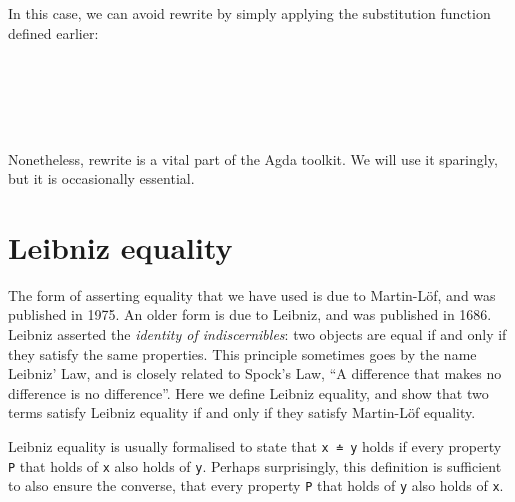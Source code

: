 In this case, we can avoid rewrite by simply applying the substitution
function defined earlier:

\begin{fence}
\begin{code}%
\>[0]\AgdaSpace{}%
\AgdaSymbol{:}\AgdaSpace{}%
\AgdaSpace{}%
\AgdaSymbol{(}\AgdaSpace{}%
\AgdaSpace{}%
\AgdaSymbol{:}\AgdaSpace{}%
\AgdaSymbol{)}\<%
\\
\>[0][@{}l@{\AgdaIndent{0}}]%
\>[2]%
\>[502I]\AgdaSpace{}%
\AgdaSymbol{(}\AgdaSpace{}%
\AgdaOperator{\AgdaFunction{+}}\AgdaSpace{}%
\AgdaSymbol{)}\<%
\\
\>[.][@{}l@{}]\<[502I]%
\>[4]\AgdaComment{------------}\<%
\\
%
\>[2]\AgdaSpace{}%
\AgdaSpace{}%
\AgdaSymbol{(}\AgdaSpace{}%
\AgdaOperator{\AgdaFunction{+}}\AgdaSpace{}%
\AgdaSymbol{)}\<%
\\
\>[0]\AgdaSpace{}%
\AgdaSpace{}%
%
\>[16]\AgdaSymbol{=}%
\>[19]\AgdaSpace{}%
\AgdaSpace{}%
\AgdaSymbol{(}\AgdaSpace{}%
\AgdaSpace{}%
\AgdaSymbol{)}\<%
\end{code}
\end{fence}

Nonetheless, rewrite is a vital part of the Agda toolkit. We will use it
sparingly, but it is occasionally essential.

\hypertarget{leibniz-equality}{%
\section{Leibniz equality}\label{leibniz-equality}}

The form of asserting equality that we have used is due to Martin-Löf,
and was published in 1975. An older form is due to Leibniz, and was
published in 1686. Leibniz asserted the \emph{identity of
indiscernibles}: two objects are equal if and only if they satisfy the
same properties. This principle sometimes goes by the name Leibniz' Law,
and is closely related to Spock's Law, ``A difference that makes no
difference is no difference''. Here we define Leibniz equality, and show
that two terms satisfy Leibniz equality if and only if they satisfy
Martin-Löf equality.

Leibniz equality is usually formalised to state that \texttt{x\ ≐\ y}
holds if every property \texttt{P} that holds of \texttt{x} also holds
of \texttt{y}. Perhaps surprisingly, this definition is sufficient to
also ensure the converse, that every property \texttt{P} that holds of
\texttt{y} also holds of \texttt{x}.

